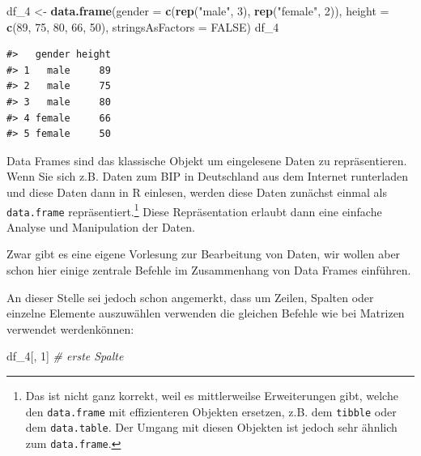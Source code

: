 \documentclass[]{tufte-book}
\newenvironment{Shaded}{}{}
\newcommand{\KeywordTok}[1]{\textcolor[rgb]{0.00,0.44,0.13}{\textbf{#1}}}
\newcommand{\DataTypeTok}[1]{\textcolor[rgb]{0.56,0.13,0.00}{#1}}
\newcommand{\DecValTok}[1]{\textcolor[rgb]{0.25,0.63,0.44}{#1}}
\newcommand{\StringTok}[1]{\textcolor[rgb]{0.25,0.44,0.63}{#1}}
\newcommand{\CommentTok}[1]{\textcolor[rgb]{0.38,0.63,0.69}{\textit{#1}}}
\newcommand{\OtherTok}[1]{\textcolor[rgb]{0.00,0.44,0.13}{#1}}
\newcommand{\NormalTok}[1]{#1}
\begin{document}
\begin{Shaded}
\begin{Highlighting}[]
\NormalTok{df_}\DecValTok{4}\NormalTok{ <-}\StringTok{ }\KeywordTok{data.frame}\NormalTok{(}\DataTypeTok{gender =} \KeywordTok{c}\NormalTok{(}\KeywordTok{rep}\NormalTok{(}\StringTok{"male"}\NormalTok{, }\DecValTok{3}\NormalTok{), }
    \KeywordTok{rep}\NormalTok{(}\StringTok{"female"}\NormalTok{, }\DecValTok{2}\NormalTok{)), }\DataTypeTok{height =} \KeywordTok{c}\NormalTok{(}\DecValTok{89}\NormalTok{, }\DecValTok{75}\NormalTok{, }\DecValTok{80}\NormalTok{, }
    \DecValTok{66}\NormalTok{, }\DecValTok{50}\NormalTok{), }\DataTypeTok{stringsAsFactors =} \OtherTok{FALSE}\NormalTok{)}
\NormalTok{df_}\DecValTok{4}
\end{Highlighting}
\end{Shaded}

\begin{verbatim}
#>   gender height
#> 1   male     89
#> 2   male     75
#> 3   male     80
#> 4 female     66
#> 5 female     50
\end{verbatim}

Data Frames sind das klassische Objekt um eingelesene Daten zu
repräsentieren. Wenn Sie sich z.B. Daten zum BIP in Deutschland aus dem
Internet runterladen und diese Daten dann in R einlesen, werden diese
Daten zunächst einmal als \texttt{data.frame} repräsentiert.\footnote{Das
  ist nicht ganz korrekt, weil es mittlerweilse Erweiterungen gibt,
  welche den \texttt{data.frame} mit effizienteren Objekten ersetzen,
  z.B. dem \texttt{tibble} oder dem \texttt{data.table}. Der Umgang mit
  diesen Objekten ist jedoch sehr ähnlich zum \texttt{data.frame}.}
Diese Repräsentation erlaubt dann eine einfache Analyse und Manipulation
der Daten.

Zwar gibt es eine eigene Vorlesung zur Bearbeitung von Daten, wir wollen
aber schon hier einige zentrale Befehle im Zusammenhang von Data Frames
einführen.

An dieser Stelle sei jedoch schon angemerkt, dass um Zeilen, Spalten
oder einzelne Elemente auszuwählen verwenden die gleichen Befehle wie
bei Matrizen verwendet werdenkönnen:

\begin{Shaded}
\begin{Highlighting}[]
\NormalTok{df_}\DecValTok{4}\NormalTok{[, }\DecValTok{1}\NormalTok{]  }\CommentTok{# erste Spalte}
\end{Highlighting}
\end{Shaded}
\end{document}
